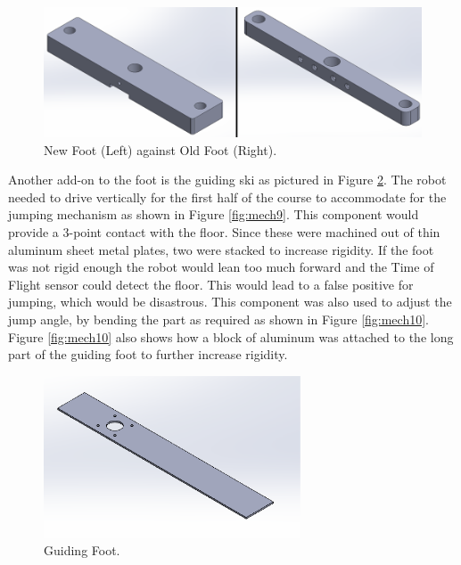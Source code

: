 \documentclass[ece]{uw-wkrpt}
\begin{document}
\begin{figure}
    \centering
    \includegraphics[width=5.5in]{res/mech7}
    \caption[Comparison of changes in mechanical design of foot]
          {New Foot (Left) against Old Foot (Right).}
    \label{fig:mech7}
\end{figure}

Another add-on to the foot is the guiding ski as pictured in Figure \ref{fig:mech8}. The robot needed to drive vertically for the first half of the course to accommodate for the jumping mechanism as shown in Figure \ref{fig:mech9}. This component would provide a 3-point contact with the floor. Since these were machined out of thin aluminum sheet metal plates, two were stacked to increase rigidity. If the foot was not rigid enough the robot would lean too much forward and the Time of Flight sensor could detect the floor. This would lead to a false positive for jumping, which would be disastrous. This component was also used to adjust the jump angle, by bending the part as required as shown in Figure \ref{fig:mech10}. Figure \ref{fig:mech10} also shows how a block of aluminum was attached to the long part of the guiding foot to further increase rigidity. 

\begin{figure}
    \centering
    \includegraphics[width=3.0in]{res/mech8}
    \caption[Guiding Foot]
          {Guiding Foot.}
    \label{fig:mech8}
\end{figure}
\end{document}

